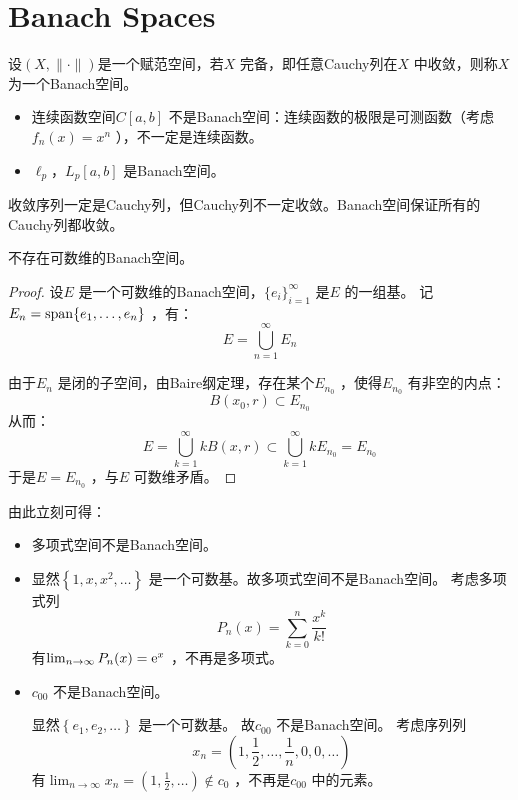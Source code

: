 \section{Banach Spaces}

\begin{definition}
    设\((X,\|\cdot\|)\)是一个赋范空间，若\(X\) 完备，即任意Cauchy列在\(X\) 中收敛，则称\(X\)
    为一个Banach空间。
\end{definition}

\begin{example}
    \begin{itemize}
        \item 连续函数空间\(C[a,b]\) 不是Banach空间：连续函数的极限是可测函数（考虑\(f_{n}(x) =
            x^{n}\) ），不一定是连续函数。
        \item \(\ell_{p}\)，\(L_{p}[a,b]\) 是Banach空间。
    \end{itemize}
\end{example}

收敛序列一定是Cauchy列，但Cauchy列不一定收敛。Banach空间保证所有的Cauchy列都收敛。

\begin{theorem}
    不存在可数维的Banach空间。
\end{theorem}

\begin{proof}
    设\(E\) 是一个可数维的Banach空间，\(\{e_{i}\}_{i=1}^{\infty}\) 是\(E\) 的一组基。
    记\(E_{n} = \operatorname{span}\{e_{1},\ldots,e_{n}\}\) ，有：\[
        E = \bigcup_{n=1}^{\infty} E_{n}
    \]

    由于\(E_{n}\) 是闭的子空间，由Baire纲定理，存在某个\(E_{n_{0}}\) ，使得\(E_{n_{0}}\) 有非空的内点：
    \[
        B(x_{0},r) \subset E_{n_{0}}
    \]
    从而：\[
        E = \bigcup_{k=1}^{\infty} k B(x,r) \subset
        \bigcup_{k=1}^{\infty} kE_{n_{0}} = E_{n_{0}}
    \]
    于是\(E = E_{n_{0}}\) ，与\(E\) 可数维矛盾。
\end{proof}

由此立刻可得：
\begin{example}
    \begin{itemize}
        \item 多项式空间不是Banach空间。
        \item
            显然\(\left\{ 1, x, x^{2}, \ldots \right\}\) 是一个可数基。故多项式空间不是Banach空间。
            考虑多项式列\[
                P_{n}(x) = \sum_{k=0}^{n} \frac{x^{k}}{k!}
            \]
            有\(\lim_{n \to \infty} P_{n}(x) = \mathrm{e}^{x}\) ，不再是多项式。

        \item \(c_{00}\) 不是Banach空间。

            显然\(\left\{ e_{1}, e_{2}, \ldots \right\}\) 是一个可数基。
            故\(c_{00}\) 不是Banach空间。
            考虑序列列\[
                x_{n} = \left(1, \frac{1}{2}, \ldots, \frac{1}{n}, 0,
                0, \ldots \right)
            \]
            有\(\lim_{n \to \infty} x_{n} = \left( 1, \frac{1}{2},
            \ldots  \right) \notin c_{0}\) ，不再是\(c_{00}\) 中的元素。
    \end{itemize}
\end{example}

